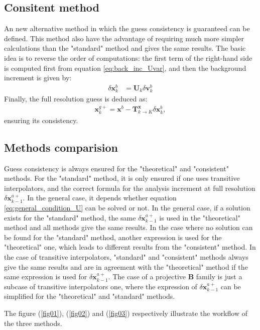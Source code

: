\documentclass[npg, manuscript]{copernicus}
\begin{document}
\subsection{Consitent method}
An new alternative method in which the guess consistency is guaranteed can be defined. This method also have the advantage of requiring much more simpler calculations than the "standard" method and gives the same results. The basic idea is to reverse the order of computations: the first term of the right-hand side is computed first from equation \eqref{eq:back_inc_Uvar}, and then the background increment is given by:
\begin{align}
\label{eq:alternative_U}
\delta \mathbf{x}^b_k & = \mathbf{U}_k \delta \mathbf{v}^b_k
\end{align}
Finally, the full resolution guess is deduced as:
\begin{align}
\label{eq:alternative_guess_full}
\mathbf{x}^{g+}_k = \mathbf{x}^b - \mathbf{T}^\mathbf{x}_{k \rightarrow K} \delta \mathbf{x}^b_k,
\end{align}
ensuring its consistency.

\subsection{Methods comparision}
Guess consistency is always ensured for the "theoretical" and "consistent" methods. For the "standard" method, it is only ensured if one uses transitive interpolators, and the correct formula for the analysis increment at full resolution $\delta \mathbf{x}^{a+}_{k-1}$. In the general case, it depends whether equation \eqref{eq:general_condition_U} can be solved or not.
In the general case, if a solution exists for the "standard" method, the same $\delta \mathbf{x}^{a+}_{k-1}$ is used in the "theoretical" method and all methods give the same results. In the case where no solution can be found for the "standard" method, another expression is used for the "theoretical" one, which leads to different results from the "consistent" method.
In the case of transitive interpolators, "standard" and "consistent" methods always give the same results and are in agreement with the "theoretical" method if the same expression is used for $\delta \mathbf{x}^{a+}_{k-1}$. The case of a projective $\mathbf{B}$ family is just a subcase of transitive interpolators one, where the expression of $\delta \mathbf{x}^{a+}_{k-1}$ can be simplified for the "theoretical" and "standard" methods.

The figure (\ref{fig01}), (\ref{fig02}) and (\ref{fig03}) respectively illustrate the workflow of the three methods.
\end{document}

